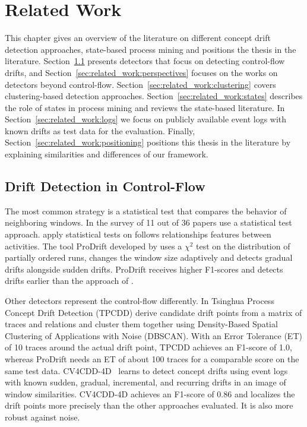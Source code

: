 \chapter{Related Work}
\label{chap:related_work}
This chapter gives an overview of the literature on different concept drift detection approaches, state-based process mining and positions the thesis in the literature. Section~\ref{sec:related_work:control_flow} presents detectors that focus on detecting control-flow drifts, and Section~\ref{sec:related_work:perspectives} focuses on the works on detectors beyond control-flow. Section~\ref{sec:related_work:clustering} covers clustering-based detection approaches. Section~\ref{sec:related_work:states} describes the role of states in process mining and reviews the state-based literature. In Section~\ref{sec:related_work:logs} we focus on publicly available event logs with known drifts as test data for the evaluation. Finally, Section~\ref{sec:related_work:positioning} positions this thesis in the literature by explaining similarities and differences of our framework.

\section{Drift Detection in Control-Flow}
\label{sec:related_work:control_flow}
The most common strategy is a statistical test that compares the behavior of neighboring windows. In the survey of \textcite{sato2022survey} 11 out of 36 papers use a statistical test approach. \textcite{bose2011handling} apply statistical tests on follows relationships features between activities. The tool ProDrift developed by \textcite{maaradji2017detecting} uses a $\chi^2$ test on the distribution of partially ordered runs, changes the window size adaptively and detects gradual drifts alongside sudden drifts. ProDrift receives higher F1-scores and detects drifts earlier than the approach of \textcite{bose2011handling}.

Other detectors represent the control-flow differently. In Tsinghua Process Concept Drift Detection (TPCDD) \textcite{zheng2017detecting} derive candidate drift points from a matrix of traces and relations and cluster them together using Density-Based Spatial Clustering of Applications with Noise (DBSCAN). With an Error Tolerance (ET) of 10 traces around the actual drift point, TPCDD achieves an F1-score of 1.0, whereas ProDrift needs an ET of about 100 traces for a comparable score on the same test data. CV4CDD-4D~\autocite{kraus2025machine} learns to detect concept drifts using event logs with known sudden, gradual, incremental, and recurring drifts in an image of window similarities. CV4CDD-4D achieves an F1-score of 0.86 and localizes the drift points more precisely than the other approaches evaluated. It is also more robust against noise.

